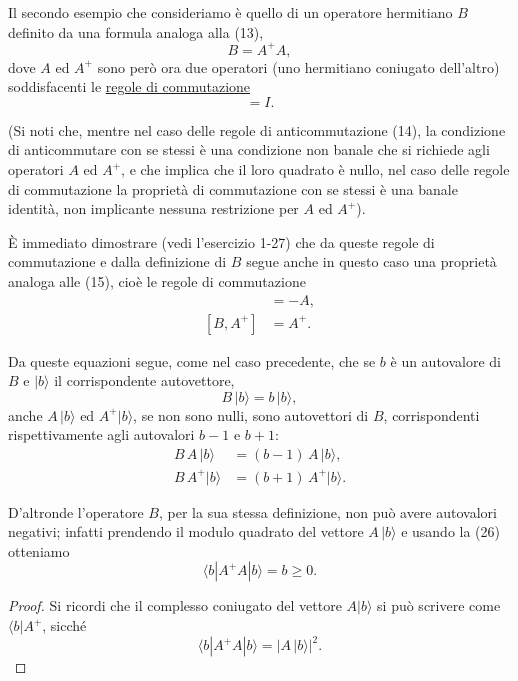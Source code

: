 \documentclass[11pt, a4paper]{book}
\numberwithin{equation}{section}
\begin{document}
Il secondo esempio che consideriamo è quello di un operatore hermitiano
$B$ definito da una formula analoga alla (13),
\begin{equation}
B = A^+A,
\end{equation}
dove $A$ ed $A^+$ sono però ora due operatori (uno hermitiano coniugato
dell'altro) soddisfacenti le \underline{regole di commutazione}
\begin{equation}
[A, A^+] = I.
\end{equation}

(Si noti che, mentre nel caso delle regole di anticommutazione (14), la
condizione di anticommutare con se stessi è una condizione non banale che
si richiede agli operatori $A$ ed $A^+$, e che implica che il loro
quadrato è nullo, nel caso delle regole di commutazione la proprietà di
commutazione con se stessi è una banale identità, non implicante nessuna
restrizione per $A$ ed $A^+$).

È immediato dimostrare (vedi l'esercizio 1-27) che da queste regole di
commutazione e dalla definizione di $B$ segue anche in questo caso una
proprietà analoga alle (15), cioè le regole di commutazione
\begin{align}
[B, A]   &= -A,   \tag{25a} \\
[B, A^+] &= A^+.  \tag{25b}
\end{align}


Da queste equazioni segue, come nel caso precedente, che se $b$ è un
autovalore di $B$ e $|b\rangle$ il corrispondente autovettore,
\begin{equation}
B\,|b\rangle = b\,|b\rangle,
\end{equation}
anche $A\,|b\rangle$ ed $A^+|b\rangle$, se non sono nulli, sono
autovettori di $B$, corrispondenti rispettivamente agli autovalori $b-1$ e
$b+1$:
\begin{align}
B\,A\,|b\rangle   &= (b-1)\,A\,|b\rangle,   \tag{27a} \\
B\,A^+|b\rangle   &= (b+1)\,A^+|b\rangle.   \tag{27b}
\end{align}

D'altronde l'operatore $B$, per la sua stessa definizione, non può avere
autovalori negativi; infatti prendendo il modulo quadrato del vettore
$A\,|b\rangle$ e usando la (26) otteniamo
\begin{equation}
\langle b|A^+A|b\rangle = b \geq 0.
\end{equation}

\begin{proof}
Si ricordi che il complesso coniugato del vettore $A|b\rangle$ si può
scrivere come $\langle b|A^+$, sicché
\[
\langle b|A^+A|b\rangle = |A\,|b\rangle|^2.
\]
\end{proof}
\end{document}
